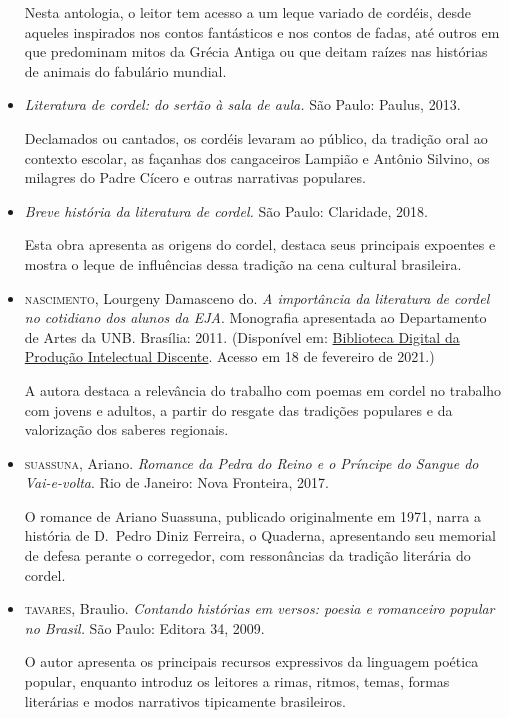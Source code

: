 \documentclass[12pt]{extarticle}
\begin{document}
\begin{itemize}
Nesta antologia, o leitor tem acesso a um leque variado de cordéis,
desde aqueles inspirados nos contos fantásticos e nos contos de fadas,
até outros em que predominam mitos da Grécia Antiga ou que deitam raízes
nas histórias de animais do fabulário mundial.

\item {} \textit{Literatura de cordel: do sertão à sala de
aula.} São Paulo: Paulus, 2013.

Declamados ou cantados, os cordéis levaram ao público, da tradição oral
ao contexto escolar, as façanhas dos cangaceiros Lampião e Antônio
Silvino, os milagres do Padre Cícero e outras narrativas populares.

\item {} \textit{Breve história da literatura de cordel.} São
Paulo: Claridade, 2018.

Esta obra apresenta as origens do cordel, destaca seus principais
expoentes e mostra o leque de influências dessa tradição na cena
cultural brasileira.

\item \textsc{nascimento}, Lourgeny Damasceno do. \textit{A importância da literatura
de cordel no cotidiano dos alunos da EJA}. Monografia apresentada ao
Departamento de Artes da UNB. Brasília: 2011. (Disponível em:
\href{https://bdm.unb.br/bitstream/10483/4463/1/2011_LourgenyDamascenodoNascimento.pdf}{Biblioteca Digital da Produção Intelectual Discente}.
Acesso em 18 de fevereiro de 2021.)

A autora destaca a relevância do trabalho com poemas em cordel no
trabalho com jovens e adultos, a partir do resgate das tradições
populares e da valorização dos saberes regionais.

\item \textsc{suassuna}, Ariano. \textit{Romance da Pedra do Reino e o Príncipe do
Sangue do Vai-e-volta}. Rio de Janeiro: Nova Fronteira, 2017.

O romance de Ariano Suassuna, publicado originalmente em 1971, narra a
história de D.~Pedro Diniz Ferreira, o Quaderna, apresentando seu
memorial de defesa perante o corregedor, com ressonâncias da tradição
literária do cordel.

\item \textsc{tavares}, Braulio. \textit{Contando histórias em versos: poesia e
romanceiro popular no Brasil.} São Paulo: Editora 34, 2009.

O autor apresenta os principais recursos expressivos da linguagem
poética popular, enquanto introduz os leitores a rimas, ritmos, temas,
formas literárias e modos narrativos tipicamente brasileiros.


\end{itemize}
\end{document}
